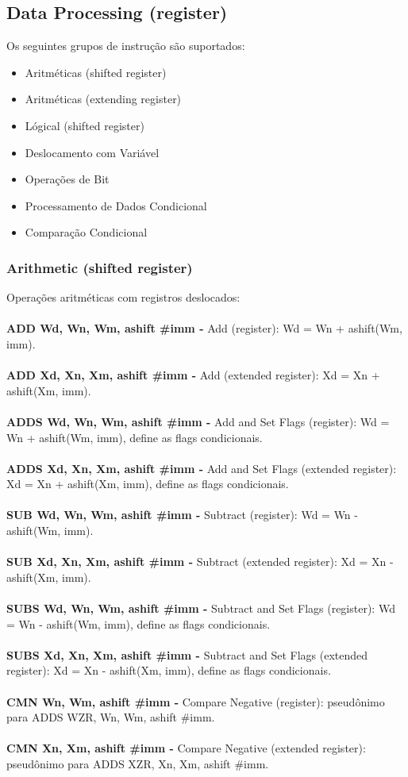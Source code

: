 \documentclass[12pt,a4paper,utf8]{ppgsi}
\begin{document}
\subsection{Data Processing (register)}
Os seguintes grupos de instrução são suportados:
\begin{itemize}
      \item Aritméticas (shifted register)
      \item Aritméticas (extending register)
      \item Lógical (shifted register)
      \item Deslocamento com Variável 
      \item Operações de Bit 
      \item Processamento de Dados Condicional
      \item Comparação Condicional
\end{itemize}

\subsubsection{Arithmetic (shifted register)}
Operações aritméticas com registros deslocados:
\\\\\textbf{ADD Wd, Wn, Wm{, ashift \#imm} -} Add (register): Wd = Wn + ashift(Wm, imm).
\\\\\textbf{ADD Xd, Xn, Xm{, ashift \#imm} -} Add (extended register): Xd = Xn + ashift(Xm, imm). 
\\\\\textbf{ADDS Wd, Wn, Wm{, ashift \#imm} -} Add and Set Flags (register): Wd = Wn + ashift(Wm, imm), define as flags condicionais. 
\\\\\textbf{ADDS Xd, Xn, Xm{, ashift \#imm} -} Add and Set Flags (extended register): Xd = Xn + ashift(Xm, imm), define as flags condicionais. 
\\\\\textbf{SUB Wd, Wn, Wm{, ashift \#imm} -} Subtract (register): Wd = Wn - ashift(Wm, imm). 
\\\\\textbf{SUB Xd, Xn, Xm{, ashift \#imm} -} Subtract (extended register): Xd = Xn - ashift(Xm, imm). 
\\\\\textbf{SUBS Wd, Wn, Wm{, ashift \#imm} -} Subtract and Set Flags (register): Wd = Wn - ashift(Wm, imm), define as flags condicionais.  
\\\\\textbf{SUBS Xd, Xn, Xm{, ashift \#imm} -} Subtract and Set Flags (extended register): Xd = Xn - ashift(Xm, imm), define as flags condicionais.  
\\\\\textbf{CMN Wn, Wm{, ashift \#imm} -} Compare Negative (register): pseudônimo para ADDS WZR, Wn, Wm{, ashift \#imm}. 
\\\\\textbf{CMN Xn, Xm{, ashift \#imm} -} Compare Negative (extended register): pseudônimo para ADDS XZR, Xn, Xm{, ashift \#imm}. 
\end{document}
